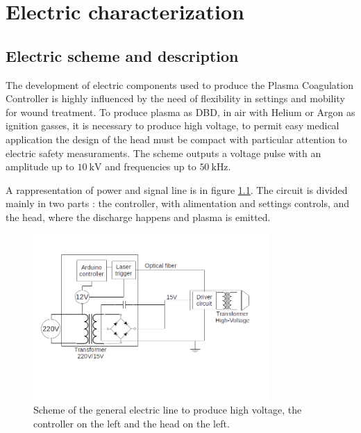 \chapter{Electric characterization}
\label{ch:electric}
\section{Electric scheme and description}
The development of electric components used to produce the Plasma Coagulation Controller is highly influenced by the need of flexibility in settings and mobility for wound treatment. To produce plasma as DBD, in air with Helium or Argon as ignition gasses, it is necessary to produce high voltage, to permit easy medical application the design of the head must be compact with particular attention to electric safety measuraments.
The scheme outputs a voltage pulse with an amplitude up to $\SI{10}{\kilo\volt}$ and frequencies up to $\SI{50}{\kilo\hertz}$.

A rappresentation of power and signal line is in figure \ref{fig:electricline}. The circuit is divided mainly in two parts %
: the controller, with alimentation and settings controls, and the head, where the discharge happens and plasma is emitted.
\begin{figure}
 \centering
 \includegraphics[width=0.8\textwidth]{Images/Linea_elettrica.png}
 \caption{Scheme of the general electric line to produce high voltage, the controller on the left and the head on the left.}
 \label{fig:electricline}
\end{figure}

